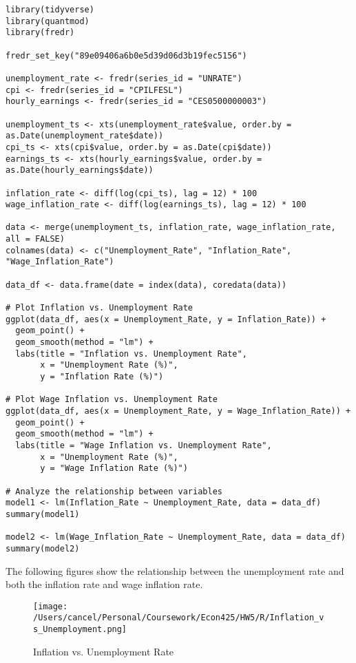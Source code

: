 \documentclass{article}
\begin{document}
\begin{verbatim}
library(tidyverse)
library(quantmod)
library(fredr)

fredr_set_key("89e09406a6b0e5d39d06d3b19fec5156")

unemployment_rate <- fredr(series_id = "UNRATE")
cpi <- fredr(series_id = "CPILFESL")
hourly_earnings <- fredr(series_id = "CES0500000003")

unemployment_ts <- xts(unemployment_rate$value, order.by = as.Date(unemployment_rate$date))
cpi_ts <- xts(cpi$value, order.by = as.Date(cpi$date))
earnings_ts <- xts(hourly_earnings$value, order.by = as.Date(hourly_earnings$date))

inflation_rate <- diff(log(cpi_ts), lag = 12) * 100
wage_inflation_rate <- diff(log(earnings_ts), lag = 12) * 100

data <- merge(unemployment_ts, inflation_rate, wage_inflation_rate, all = FALSE)
colnames(data) <- c("Unemployment_Rate", "Inflation_Rate", "Wage_Inflation_Rate")

data_df <- data.frame(date = index(data), coredata(data))

# Plot Inflation vs. Unemployment Rate
ggplot(data_df, aes(x = Unemployment_Rate, y = Inflation_Rate)) +
  geom_point() +
  geom_smooth(method = "lm") +
  labs(title = "Inflation vs. Unemployment Rate",
       x = "Unemployment Rate (%)",
       y = "Inflation Rate (%)")

# Plot Wage Inflation vs. Unemployment Rate
ggplot(data_df, aes(x = Unemployment_Rate, y = Wage_Inflation_Rate)) +
  geom_point() +
  geom_smooth(method = "lm") +
  labs(title = "Wage Inflation vs. Unemployment Rate",
       x = "Unemployment Rate (%)",
       y = "Wage Inflation Rate (%)")

# Analyze the relationship between variables
model1 <- lm(Inflation_Rate ~ Unemployment_Rate, data = data_df)
summary(model1)

model2 <- lm(Wage_Inflation_Rate ~ Unemployment_Rate, data = data_df)
summary(model2)
\end{verbatim}
The following figures show the relationship between the unemployment rate and both the inflation rate and wage inflation rate.

\begin{figure}[H]
    \centering
    \texttt{[image: /Users/cancel/Personal/Coursework/Econ425/HW5/R/Inflation\_vs\_Unemployment.png]}
    \caption{Inflation vs. Unemployment Rate}
\end{figure}
\end{document}
